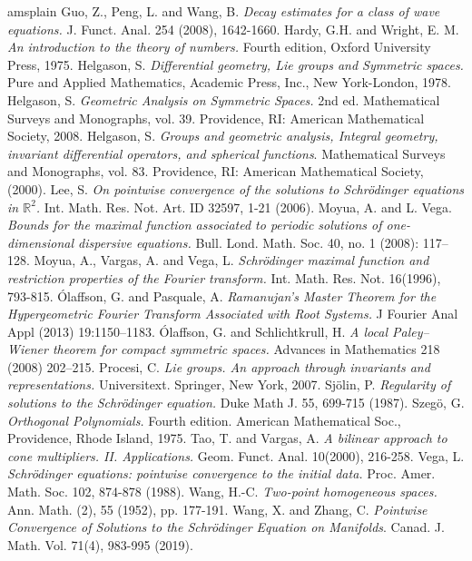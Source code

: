 \documentclass[12pt]{amsart}
\theoremstyle{definition}
\newcommand{\R}{\mathbb R}%
\numberwithin{equation}{section}
\begin{document}
\begin{thebibliography}{amsplain}
 Guo, Z., Peng, L. and Wang, B. {\em Decay estimates for a class of wave equations.} J. Funct. Anal. 254 (2008), 1642-1660.
 Hardy, G.H. and Wright, E. M. {\em An introduction to the theory of numbers.} Fourth edition, Oxford University Press, 1975.
 Helgason, S. {\em Differential geometry, Lie groups and Symmetric spaces.} Pure and Applied Mathematics, Academic Press, Inc., New York-London, 1978.
 Helgason, S. {\em Geometric Analysis on Symmetric Spaces.} 2nd ed. Mathematical Surveys and Monographs, vol. 39. Providence, RI: American Mathematical Society, 2008.
 Helgason, S. {\em Groups and geometric analysis, Integral geometry, invariant differential operators, and spherical functions}. Mathematical Surveys and Monographs, vol. 83. Providence, RI: American Mathematical Society, (2000).
 Lee, S. {\em On pointwise convergence of the solutions to Schr\"odinger equations in $\R^2$.} Int. Math. Res. Not. Art. ID 32597, 1-21 (2006).
 Moyua, A. and L. Vega. {\em Bounds for the maximal function associated to periodic solutions of one-dimensional dispersive equations.} Bull. Lond. Math. Soc. 40, no. 1 (2008): 117–128.
 Moyua, A., Vargas, A. and Vega, L. {\em Schr\"odinger maximal function and restriction properties of the Fourier transform.} Int. Math. Res. Not. 16(1996), 793-815.
 \'Olaffson, G. and Pasquale, A. {\em Ramanujan’s Master Theorem for the Hypergeometric
Fourier Transform Associated with Root Systems.} J Fourier Anal Appl (2013) 19:1150–1183\:.
 \'Olaffson, G. and Schlichtkrull, H. {\em A local Paley–Wiener theorem for compact symmetric spaces.} Advances in Mathematics 218 (2008) 202–215.
 Procesi, C. {\em Lie groups. An approach through invariants and representations.} Universitext. Springer, New York, 2007. 
 Sj\"olin, P. {\em Regularity of solutions to the Schr\"odinger equation.} Duke Math J. 55, 699-715 (1987).
 Szeg\"o, G. {\em Orthogonal Polynomials.} Fourth edition. American Mathematical Soc., Providence, Rhode Island, 1975.
 Tao, T. and Vargas, A. {\em A bilinear approach to cone multipliers. II. Applications.} Geom. Funct. Anal. 10(2000), 216-258.
 Vega, L. {\em Schr\"odinger equations: pointwise convergence to the initial data.} Proc. Amer. Math. Soc. 102, 874-878 (1988).
 Wang, H.-C. {\em Two-point homogeneous spaces.} Ann. Math. (2), 55 (1952), pp. 177-191.
 Wang, X. and Zhang, C. {\em Pointwise Convergence of Solutions to the Schr\"odinger Equation on Manifolds}. Canad. J. Math. Vol. 71(4), 983-995 (2019).


\end{thebibliography}
\end{document}
